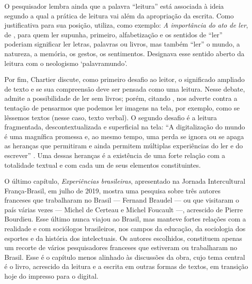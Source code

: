 \documentclass[portuguese]{textolivre}
\begin{document}
O pesquisador lembra ainda que a palavra “leitura” está associada à ideia segundo a qual a prática de leitura vai além da apropriação da escrita. Como justificativa para sua posição, utiliza, como exemplo: \emph{A importância do ato de ler}, de \textcite{freire1989}, para quem ler supunha, primeiro, alfabetização e os sentidos de “ler” poderiam significar ler letras, palavras ou livros, mas também “ler” o mundo, a natureza, a memória, os gestos, os sentimentos. Designava esse sentido aberto da leitura com o neologismo ‘palavramundo’.

Por fim, Chartier discute, como primeiro desafio ao leitor, o significado ampliado de texto e se sua compreensão deve ser pensada como uma leitura. Nesse debate, admite a possibilidade de ler sem livros; porém, citando \textcite{marin1993}, nos adverte contra a tentação de pensarmos que podemos ler imagens na tela, por exemplo, como se lêssemos textos (nesse caso, texto verbal). O segundo desafio é a leitura fragmentada, descontextualizada e superficial na tela: “A digitalização do mundo é uma magnífica promessa e, ao mesmo tempo, uma perda se ignora ou se apaga as heranças que permitiram e ainda permitem múltiplas experiências do ler e do escrever” \cite[p. 166-167]{chartier2020}. Uma dessas heranças é a existência de uma forte relação com a totalidade textual e com cada um de seus elementos constituintes.

O último capítulo, \emph{Experiências brasileiras}, apresentado na Jornada Intercultural França-Brasil, em julho de 2019, mostra uma pesquisa sobre três autores franceses que trabalharam no Brasil — Fernand Braudel — ou que visitaram o país várias vezes — Michel de Certeau e Michel Foucault —, acrescido de Pierre Bourdieu. Esse último nunca viajou ao Brasil, mas manteve fortes relações com a realidade e com sociólogos brasileiros, nos campos da educação, da sociologia dos esportes e da história dos intelectuais. Os autores escolhidos, constituem apenas um recorte de vários pesquisadores franceses que estiveram ou trabalharam no Brasil. Esse é o capítulo menos alinhado às discussões da obra, cujo tema central é o livro, acrescido da leitura e a escrita em outras formas de textos, em transição hoje do impresso para o digital.
\end{document}
